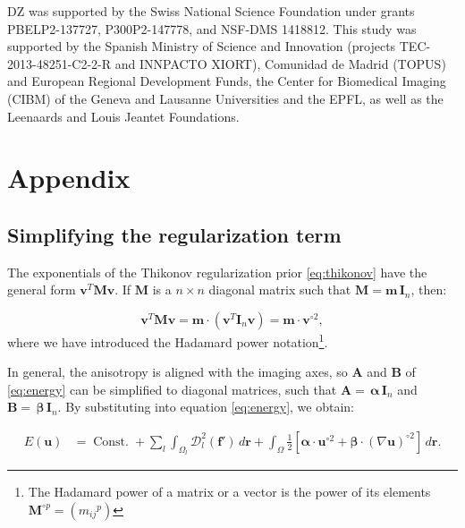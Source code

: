 \documentclass[3p,authoryear,fleqn]{elsarticle}
\DeclareMathOperator{\const}{Const.}
\providecommand{\mdist}[2]{ \mathcal{D}_{#2}^2(\mathbf{#1}) }
\renewcommand{\vec}[1]{\mathbf{#1}}
\begin{document}
DZ was supported by the Swiss National Science Foundation under grants PBELP2-137727, 
  P300P2-147778, and NSF-DMS 1418812.
This study was supported by the Spanish Ministry of Science and Innovation
  (projects TEC-2013-48251-C2-2-R and INNPACTO XIORT), Comunidad de Madrid (TOPUS) and
  European Regional Development Funds, the Center for Biomedical Imaging
  (CIBM) of the Geneva and Lausanne Universities and the EPFL, as well as the
  Leenaards and Louis Jeantet Foundations. 


\appendix
{}
\makeatletter{}
\renewcommand{\thesubsection}{Appendix \arabic{subsection}}

\section*{Appendix}

\subsection{Simplifying the regularization term}\label{app:reg_term}
The exponentials of the Thikonov regularization prior \eqref{eq:thikonov} have the general form
  $\vec{v}^T \mathbf{M} \vec{v}$.
If $\mathbf{M}$ is a $n \times n$ diagonal matrix such that $\mathbf{M} = \vec{m} \, \mathbf{I}_n$, 
  then:

\begin{equation*}
\vec{v}^T \mathbf{M} \vec{v} = \vec{m} \cdot (\vec{v}^T \mathbf{I}_n \vec{v}) = \vec{m} \cdot \vec{v}^{\circ2},
\end{equation*}
  where we have introduced the Hadamard power notation\footnote{The Hadamard power of a matrix or a vector
  is the power of its elements $\mathbf{M}^{\circ p} = ({m_{ij}}^{p})$}.

In general, the anisotropy is aligned with the imaging axes, so 
  $\mathbf{A}$ and $\mathbf{B}$ of \eqref{eq:energy} can be simplified to diagonal matrices, such that
  $\mathbf{A}= \, \boldsymbol{\alpha}\,\vec{I}_n$ and
  $\mathbf{B}= \, \boldsymbol{\beta}\,\vec{I}_n$.
By substituting into equation \eqref{eq:energy}, we obtain:

  \begin{align}
  E(\vec{u}) &= \const + \underset{l}{\sum} \int_{\Omega_l} \mdist{f'}{l} \,d\vec{r} +   \int_{\Omega} \frac12 \left[ \boldsymbol{\alpha} \cdot \vec{u}^{\circ2} + \boldsymbol{\beta} \cdot (\nabla \vec{u})^{\circ2} \right] \,d\vec{r}.
  \label{eq:app_energy}
  \end{align}  



\end{document}
